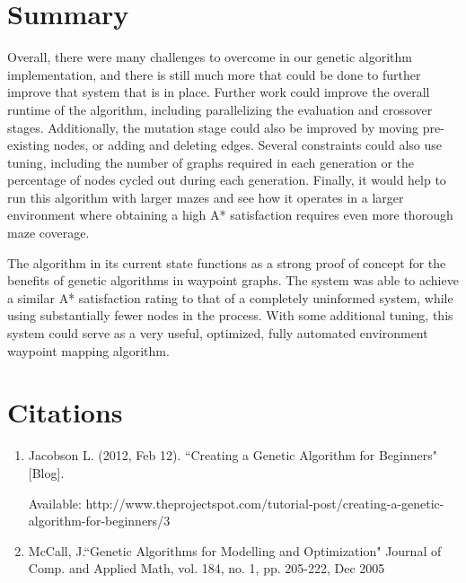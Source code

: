 \section{Summary}
	Overall, there were many challenges to overcome in our genetic algorithm implementation, and there is still much more that could be done to further improve that system that is in place. Further work could improve the overall runtime of the algorithm, including parallelizing the evaluation and crossover stages. Additionally, the mutation stage could also be improved by moving pre-existing nodes, or adding and deleting edges. Several constraints could also use tuning, including the number of graphs required in each generation or the percentage of nodes cycled out during each generation. Finally, it would help to run this algorithm with larger mazes and see how it operates in a larger environment where obtaining a high A* satisfaction requires even more thorough maze coverage.
	
	The algorithm in its current state functions as a strong proof of concept for the benefits of genetic algorithms in waypoint graphs. The system was able to achieve a similar A* satisfaction rating to that of a completely uninformed system, while using substantially fewer nodes in the process. With some additional tuning, this system could serve as a very useful, optimized, fully automated environment waypoint mapping algorithm.


\section{Citations}

\begin{enumerate}
	\item Jacobson L. (2012, Feb 12). ``Creating a Genetic Algorithm for Beginners" [Blog].
	
	Available: http://www.theprojectspot.com/tutorial-post/creating-a-genetic-algorithm-for-beginners/3 
	\item McCall, J.``Genetic Algorithms for Modelling and Optimization" Journal of Comp. and Applied Math, vol. 184, no. 1, pp. 205-222, Dec 2005
\end{enumerate}